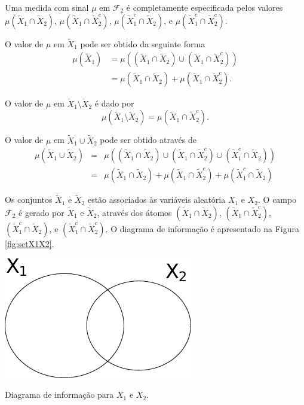 \begin{example}[$n=2$]
  Uma medida com sinal $\mu$ em $\mathcal{F}_2$ é completamente especificada pelos
  valores
  $\mu( \tilde{X}_1 \cap \tilde{X}_2 )$,
  $\mu( \tilde{X}_1 \cap \tilde{X}_2^c )$,
  $\mu( \tilde{X}_1^c \cap \tilde{X}_2 )$, e
  $\mu( \tilde{X}_1^c \cap \tilde{X}_2^c )$.

  O valor de $\mu$ em $\tilde{X}_1$ pode ser obtido da seguinte forma
  \begin{subequations}
    \begin{align}
      \mu( \tilde{X}_1 ) &= \mu( (\tilde{X}_1 \cap \tilde{X}_2) \cup ( \tilde{X}_1 \cap \tilde{X}_2^c) ) \\
                &= \mu( \tilde{X}_1 \cap \tilde{X}_2 ) + \mu( \tilde{X}_1 \cap \tilde{X}_2^c ) .
    \end{align}
  \end{subequations}

  O valor de $\mu$ em $\tilde{X}_1 \setminus \tilde{X}_2$ é dado por
  \begin{equation}
  \mu( \tilde{X}_1 \setminus \tilde{X}_2 ) = \mu( \tilde{X}_1 \cap \tilde{X}_2^c ) .
  \end{equation}

  O valor de $\mu$ em $\tilde{X}_1 \cup \tilde{X}_2$ pode ser obtido através de
  \begin{subequations}
    \begin{align}
      \mu( \tilde{X}_1 \cup \tilde{X}_2 ) &=& \mu( (\tilde{X}_1 \cap \tilde{X}_2) \cup (\tilde{X}_1 \cap \tilde{X}_2^c) \cup (\tilde{X}_1^c \cap \tilde{X}_2) ) \\
        &=& \mu( \tilde{X}_1 \cap \tilde{X}_2 ) + \mu( \tilde{X}_1 \cap \tilde{X}_2^c ) + \mu(\tilde{X}_1^c \cap \tilde{X}_2)
    \end{align}
  \end{subequations}

\end{example}

Os conjuntos $\tilde{X}_1$ e $\tilde{X}_2$ estão associados às variáveis
aleatória $X_1$ e $X_2$. O campo $\mathcal{F}_2$ é gerado por $\tilde{X}_1$ e $\tilde{X}_2$,
através dos átomos
$(\tilde{X}_1 \cap \tilde{X}_2)$,
$(\tilde{X}_1 \cap \tilde{X}_2^c)$,
$(\tilde{X}_1^c \cap \tilde{X}_2)$, e
$(\tilde{X}_1^c \cap \tilde{X}_2^c)$.
O diagrama de informação é apresentado na Figura \ref{fig:setX1X2}.
  \begin{marginfigure}%
    \includegraphics[width=0.5\linewidth]{figures/setX1X2.pdf}
    \caption{Diagrama de informação para $X_1$ e $X_2$.}
    \label{fig:setX1X2}
  \end{marginfigure}

